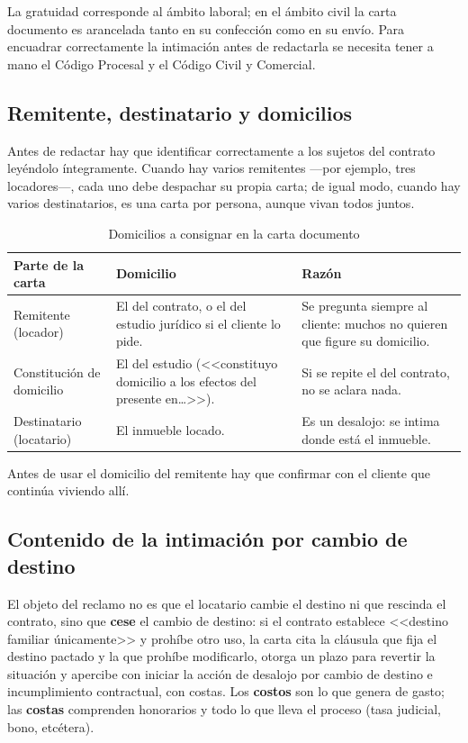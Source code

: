 \documentclass[12pt,oneside]{book}
\begin{document}
La gratuidad corresponde al ámbito laboral; en el ámbito civil la carta documento es arancelada tanto en su confección como en su envío. Para encuadrar correctamente la intimación antes de redactarla se necesita tener a mano el Código Procesal y el Código Civil y Comercial.

\subsection{Remitente, destinatario y domicilios}

Antes de redactar hay que identificar correctamente a los sujetos del contrato leyéndolo íntegramente. Cuando hay varios remitentes ---por ejemplo, tres locadores---, cada uno debe despachar su propia carta; de igual modo, cuando hay varios destinatarios, es una carta por persona, aunque vivan todos juntos.

\begin{table}[H]
\centering
\caption{Domicilios a consignar en la carta documento}
\begin{tabularx}{\textwidth}{>{\raggedright\arraybackslash}p{} >{\raggedright\arraybackslash}X >{\raggedright\arraybackslash}X}
\toprule
\textbf{Parte de la carta} & \textbf{Domicilio} & \textbf{Razón} \\
\midrule
Remitente (locador) & El del contrato, o el del estudio jurídico si el cliente lo pide. & Se pregunta siempre al cliente: muchos no quieren que figure su domicilio. \\
Constitución de domicilio & El del estudio (<<constituyo domicilio a los efectos del presente en\ldots>>). & Si se repite el del contrato, no se aclara nada. \\
Destinatario (locatario) & El inmueble locado. & Es un desalojo: se intima donde está el inmueble. \\
\bottomrule
\end{tabularx}
\end{table}

Antes de usar el domicilio del remitente hay que confirmar con el cliente que continúa viviendo allí.

\subsection{Contenido de la intimación por cambio de destino}

El objeto del reclamo no es que el locatario cambie el destino ni que rescinda el contrato, sino que \textbf{cese} el cambio de destino: si el contrato establece <<destino familiar únicamente>> y prohíbe otro uso, la carta cita la cláusula que fija el destino pactado y la que prohíbe modificarlo, otorga un plazo para revertir la situación y apercibe con iniciar la acción de desalojo por cambio de destino e incumplimiento contractual, con costas. Los \textbf{costos} son lo que genera de gasto; las \textbf{costas} comprenden honorarios y todo lo que lleva el proceso (tasa judicial, bono, etcétera).
\end{document}
